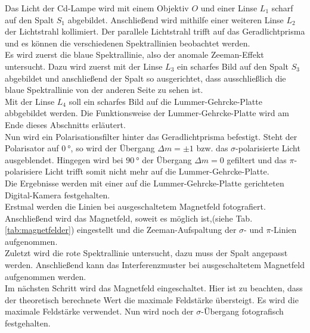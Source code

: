 Das Licht der Cd-Lampe wird mit einem Objektiv $O$ und einer Linse $L_1$ scharf auf den Spalt $S_1$ abgebildet.
Anschließend wird mithilfe einer weiteren Linse $L_2$ der Lichtstrahl kollimiert.
Der parallele Lichtstrahl trifft auf das Geradlichtprisma und es können die verschiedenen Spektrallinien beobachtet werden.
\\
Es wird zuerst die blaue Spektrallinie, also der anomale Zeeman-Effekt untersucht.
Dazu wird zuerst mit der Linse $L_3$ ein scharfes Bild auf den Spalt $S_3$ abgebildet und anschließend der Spalt so ausgerichtet, dass ausschließlich die blaue Spektrallinie von der anderen Seite zu sehen ist.
\\
Mit der Linse $L_4$ soll ein scharfes Bild auf die Lummer-Gehrcke-Platte abbgebildet werden.
Die Funktionsweise der Lummer-Gehrcke-Platte wird am Ende dieses Abschnitts erläutert.
\\
Nun wird ein Polarisationsfilter hinter das Geradlichtprisma befestigt.
Steht der Polarisator auf $\SI{0}{\degree}$, so wird der Übergang $\Delta m = \pm 1$ bzw. das $\sigma$-polarisierte Licht ausgeblendet.
Hingegen wird bei $\SI{90}{\degree}$ der Übergang $\Delta m = 0$ gefiltert und das $\pi$-polarisiere Licht trifft somit nicht mehr auf die Lummer-Gehrcke-Platte.
\\
Die Ergebnisse werden mit einer auf die Lummer-Gehrcke-Platte gerichteten Digital-Kamera festgehalten.
\\
Erstmal werden die Linien bei ausgeschaltetem Magnetfeld fotografiert.
Anschließend wird das Magnetfeld, soweit es möglich ist,(siehe Tab. \ref{tab:magnetfelder}) eingestellt und die Zeeman-Aufspaltung der $\sigma$- und $\pi$-Linien aufgenommen.
\\
Zuletzt wird die rote Spektrallinie untersucht, dazu muss der Spalt angepasst werden.
Anschließend kann das Interferenzmuster bei ausgeschaltetem Magnetfeld aufgenommen werden.
\\
Im nächsten Schritt wird das Magnetfeld eingeschaltet.
Hier ist zu beachten, dass der theoretisch berechnete Wert die maximale Feldstärke übersteigt.
Es wird die maximale Feldstärke verwendet.
Nun wird noch der $\sigma$-Übergang fotografisch festgehalten.